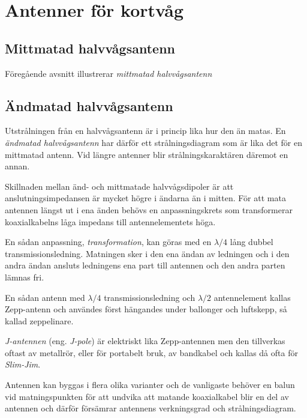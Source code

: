 \section{Antenner för kortvåg}

\subsection{Mittmatad halvvågsantenn}

Föregående avsnitt illustrerar \emph{mittmatad halvvågsantenn}

\subsection{Ändmatad halvvågsantenn}
\label{ändmatad_halvvågsantenn}

Utstrålningen från en halvvågsantenn är i princip lika hur den än matas.
En \emph{ändmatad halvvågsantenn} har därför ett strålningsdiagram som är lika
det för en mittmatad antenn.
Vid längre antenner blir strålningskaraktären däremot en annan.

Skillnaden mellan änd- och mittmatade halvvågsdipoler är att
anslutningsimpedansen är mycket högre i ändarna än i mitten.
För att mata antennen längst ut i ena änden behövs en anpassningskrets som
transformerar koaxialkabelns låga impedans till antennelementets höga.

En sådan anpassning, \emph{transformation}, kan göras med en \(\lambda/4\) lång
dubbel transmissionsledning.
Matningen sker i den ena ändan av ledningen och i den andra ändan ansluts
ledningens ena part till antennen och den andra parten lämnas fri.

En sådan antenn med \(\lambda/4\) transmissionsledning och \(\lambda/2\)
antennelement kallas Zepp-antenn och användes först hängandes under ballonger
och luftskepp, så kallad zeppelinare.

\emph{J-antennen} (eng. \emph{J-pole}) \cite[J-antenne]{Rothammel2001} är
elektriskt lika Zepp-antennen men den tillverkas oftast av metallrör, eller
för portabelt bruk, av bandkabel och kallas då ofta för \emph{Slim-Jim}.

Antennen kan byggas i flera olika varianter och de vanligaste behöver en balun
vid matningspunkten för att undvika att matande koaxialkabel blir en del av
antennen och därför försämrar antennens verkningsgrad och strålningsdiagram.

